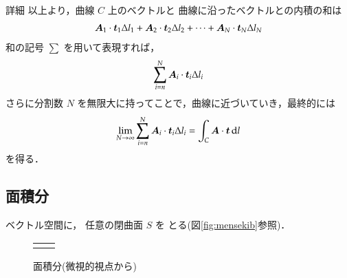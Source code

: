 \begin{memo}{詳細}
        以上より，曲線 $C$ 上のベクトルと
        曲線に沿ったベクトルとの内積の和は
        \begin{align}
        \boldsymbol{A}_{1}\cdot\boldsymbol{t}_{1}\Delta l_{1}
        +\boldsymbol{A}_{2}\cdot\boldsymbol{t}_{2}\Delta l_{2}
        +\cdots
        +\boldsymbol{A}_{N}\cdot\boldsymbol{t}_{N}\Delta l_{N}
        \end{align}
        和の記号 $\displaystyle\sum$ を用いて表現すれば，
        \begin{align}
        \sum_{i=n}^{N}\boldsymbol{A}_{i}\cdot\boldsymbol{t}_{i}\Delta l_{i}
        \end{align}
        さらに分割数 $N$ を無限大に持ってことで，曲線に近づいていき，最終的には
        \begin{align}
        \lim_{N\to\infty}\sum_{i=n}^{N}\boldsymbol{A}_{i}\cdot\boldsymbol{t}_{i}\Delta l_{i}
        =\int_{C} \boldsymbol{A}\cdot \boldsymbol{t}\,\mathrm{d} l
        \end{align}
        を得る．
    \end{memo}

 \subsection{面積分}
        ベクトル空間に，
        任意の閉曲面 $S$ を
        とる(図\ref{fig:mensekib}参照)．
                \begin{figure}[hbt]
                    \begin{tabular}{cc}
                        \begin{minipage}{0.5\hsize}
                    \begin{center}
                        {mensekibun1.pdf}
                        \caption{面積分(巨視的視点から)}
                        \label{fig:mensekib}
                    \end{center}
                        \end{minipage}
                        \begin{minipage}{0.5\hsize}
                    \begin{center}
                        {mennsekibunnbisi.pdf}
                        \caption{面積分(微視的視点から)}
                        \label{fig:mennsekibunnsbisi}
                    \end{center}
                        \end{minipage}
                    \end{tabular}
                \end{figure}


